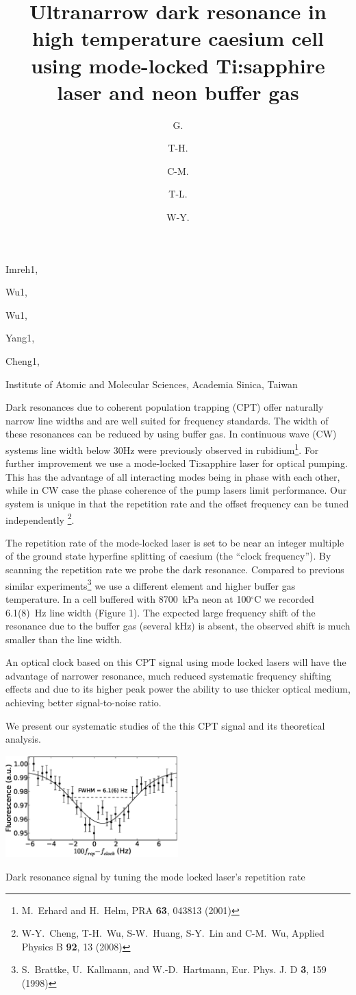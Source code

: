 \documentclass[10pt]{article}
\begin{document}

\title{Ultranarrow dark resonance in high temperature caesium cell using mode-locked Ti:sapphire laser and neon buffer gas}

\begin{authors}
  \author{G.}{Imreh}{1},
  \author{T-H.}{Wu}{1},
  \author{C-M.}{Wu}{1},
  \author{T-L.}{Yang}{1},
  \author{W-Y.}{Cheng}{1},
\end{authors}

\address{1}{Institute of Atomic and Molecular Sciences, Academia Sinica, Taiwan}

\begintext

Dark resonances due to coherent population trapping (CPT) offer naturally narrow line widths and are well suited for frequency standards. The width of these resonances can be reduced by using buffer gas. In continuous wave (CW) systems line width below 30Hz were previously observed in rubidium\footnote{M.~Erhard and H.~Helm, PRA {\bf 63}, 043813 (2001)}. For further improvement we use a mode-locked Ti:sapphire laser for optical pumping. This has the advantage of all interacting modes being in phase with each other, while in CW case the phase coherence of the pump lasers limit performance. Our system is unique in that the repetition rate and the offset frequency can be tuned independently \footnote{W-Y.~Cheng, T-H.~Wu, S-W.~Huang, S-Y.~Lin and C-M.~Wu, Applied Physics B {\bf 92}, 13 (2008)}. 

The repetition rate of the mode-locked laser is set to be near an integer multiple of the ground state hyperfine splitting of caesium (the ``clock frequency''). By scanning the repetition rate we probe the dark resonance. Compared to previous similar experiments\footnote{S.~Brattke, U.~Kallmann, and W.-D.~Hartmann,  Eur. Phys. J. D {\bf 3}, 159 (1998)} we use a different element and higher buffer gas temperature. In a cell buffered with 8700~kPa neon at 100$^\circ$C we recorded 6.1(8)~Hz line width (Figure 1). The expected large frequency shift of the resonance due to the buffer gas (several kHz) is absent, the observed shift is much smaller than the line width.

An optical clock based on this CPT signal using mode locked lasers will have the advantage of narrower resonance, much reduced systematic frequency shifting effects and due to its higher peak power the ability to use thicker optical medium, achieving better signal-to-noise ratio.

We present our systematic studies of the this CPT signal and its theoretical analysis.

\begin{center}
  \includegraphics[width=0.5\textwidth]{8700Ne_buffer.eps}
\end{center}

\caption{1}{Dark resonance signal by tuning the mode locked laser's repetition rate}

\end{document}
